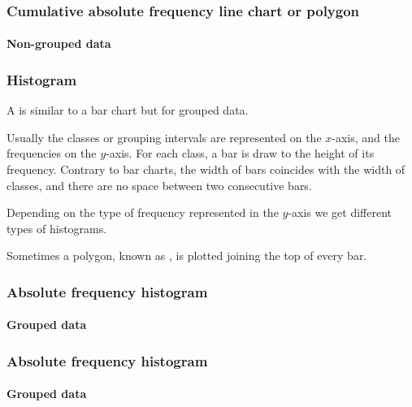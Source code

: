 \begin{frame}
\frametitle{Cumulative absolute frequency line chart or polygon}
\framesubtitle{Non-grouped data}
\begin{center}
\scalebox{0.6}{} 
\end{center} 
\end{frame}


\begin{frame}
\frametitle{Histogram}
A  is similar to a bar chart but for grouped data.  

Usually the classes or grouping intervals are represented on the $x$-axis, and the frequencies on the $y$-axis. 
For each class, a bar is draw to the height of its frequency.
Contrary to bar charts, the width of bars coincides with the width of classes, and there are no space between two
consecutive bars.

Depending on the type of frequency represented in the $y$-axis we get different types of histograms.
 
Sometimes a polygon, known as , is plotted joining the top of every bar.
\end{frame}


\begin{frame}
\frametitle{Absolute frequency histogram}
\framesubtitle{Grouped data}
\begin{center}
\scalebox{0.6}{}
\end{center} 
\end{frame}


\begin{frame}
\frametitle{Absolute frequency histogram}
\framesubtitle{Grouped data}
\begin{center}
\scalebox{0.6}{} 
\end{center} 
\end{frame}

